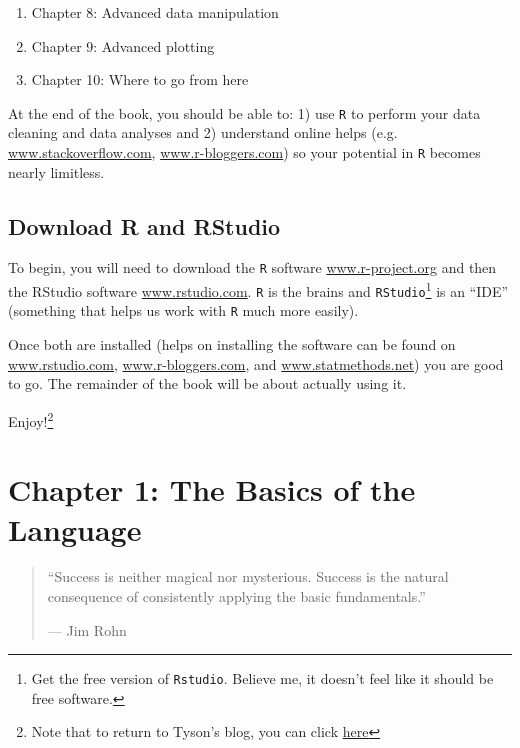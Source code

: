 \documentclass[]{tufte-book}
\providecommand{\tightlist}{%
  \setlength{\itemsep}{0pt}\setlength{\parskip}{0pt}}
\theoremstyle{definition}
\theoremstyle{definition}
\theoremstyle{remark}
\begin{document}
\begin{enumerate}
\def\labelenumi{\arabic{enumi}.}
\setcounter{enumi}{7}
\tightlist
\item
  Chapter 8: Advanced data manipulation
\item
  Chapter 9: Advanced plotting
\item
  Chapter 10: Where to go from here
\end{enumerate}

At the end of the book, you should be able to: 1) use \texttt{R} to
perform your data cleaning and data analyses and 2) understand online
helps (e.g. \url{www.stackoverflow.com}, \url{www.r-bloggers.com}) so
your potential in \texttt{R} becomes nearly limitless.

\section*{Download R and RStudio}\label{download-r-and-rstudio}

To begin, you will need to download the \texttt{R} software
\href{https://www.r-project.org/}{www.r-project.org} and then the
RStudio software \href{https://www.rstudio.com/}{www.rstudio.com}.
\texttt{R} is the brains and \texttt{RStudio}\footnote{Get the free
  version of \texttt{Rstudio}. Believe me, it doesn't feel like it
  should be free software.} is an ``IDE'' (something that helps us work
with \texttt{R} much more easily).

Once both are installed (helps on installing the software can be found
on \href{https://www.rstudio.com/}{www.rstudio.com},
\url{www.r-bloggers.com}, and \url{www.statmethods.net}) you are good to
go. The remainder of the book will be about actually using it.

Enjoy!\footnote{Note that to return to Tyson's blog, you can click
  \href{https://tysonstanley.github.io}{here}}

\chapter*{Chapter 1: The Basics of the
Language}\label{chapter-1-the-basics-of-the-language}

\begin{quote}
``Success is neither magical nor mysterious. Success is the natural
consequence of consistently applying the basic fundamentals.''

--- Jim Rohn
\end{quote}
\end{document}

